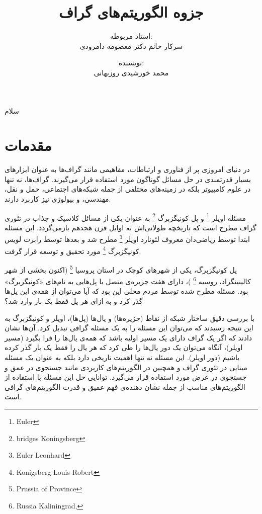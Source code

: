 \documentclass[a4paper,10pt]{book}
\title{\Huge جزوه الگوریتم‌های گراف}
\author{استاد مربوطه:\\سرکار خانم دکتر معصومه دامرودی}
\date{نویسنده:\\محمد خورشیدی روزبهانی}
\begin{document}
    \maketitle

    سلام

    \tableofcontents

    \chapter{مقدمات}

        در دنیای امروزی پر از فناوری و ارتباطات، مفاهیمی مانند گراف‌ها به عنوان ابزارهای بسیار قدرتمندی در حل مسائل گوناگون مورد استفاده قرار می‌گیرند. گراف‌ها، نه تنها در علوم کامپیوتر بلکه در زمینه‌های مختلفی از جمله شبکه‌های اجتماعی، حمل و نقل، مهندسی، و بیولوژی نیز کاربرد دارند.

        مسئله اویلر
        \footnote{\hspace{2pt}Euler}
        و پل کونیگزبرگ
        \footnote{\hspace{2pt}bridges Koningsberg}
        به عنوان یکی از مسائل کلاسیک و جذاب در تئوری گراف مطرح است که تاریخچه طولانی‌اش به اوایل قرن هجدهم بازمی‌گردد. این مسئله ابتدا توسط ریاضی‌دان معروف لئونارد اویلر
        \footnote{\hspace{2pt}Euler Leonhard}
        مطرح شد و بعدها توسط رابرت لویس کونیگزبرگ
        \footnote{\hspace{2pt}Konigsberg Louis Robert}
        مورد تحقیق و توسعه قرار گرفت.

        پل کونیگزبرگ، یکی از شهرهای کوچک در استان پروسیا
        \footnote{\hspace{2pt}Prussia of Province}
        (اکنون بخشی از شهر کالینینگراد، روسیه
        \footnote{\hspace{2pt}Russia Kaliningrad,}
        )، دارای هفت جزیره‌ی متصل با پل‌هایی به نام‌های «کونیگزبرگ» بود. مسئله مطرح شده توسط مردم محلی این بود که آیا می‌توان از همه‌ی این پل‌ها گذر کرد و به ازای هر پل فقط یک بار وارد شد؟

        با بررسی دقیق ساختار شبکه از نقاط (جزیره‌ها) و یال‌ها (پل‌ها)، اویلر و کونیگزبرگ به این نتیجه رسیدند که می‌توان این مسئله را به یک مسئله‌ گرافی تبدیل کرد. آن‌ها نشان دادند که اگر یک گراف دارای یک مسیر اولیه باشد که همه‌ی یال‌ها را فرا بگیرد (مسیر اویلر)، آنگاه می‌توان یک دور یال‌ها را طی کرد که هر یال را فقط یک بار گذر کرده باشیم (دور اویلر). این مسئله نه تنها اهمیت تاریخی دارد بلکه به عنوان یک مسئله مبنایی در تئوری گراف و همچنین در الگوریتم‌های کاربردی مانند جستجوی در عمق و جستجوی در عرض مورد استفاده قرار می‌گیرد. توانایی حل این مسئله با استفاده از الگوریتم‌های مناسب از جمله نشان دهنده‌ی فهم عمیق و قدرت الگوریتم‌های گرافی است.
    
\end{document}
